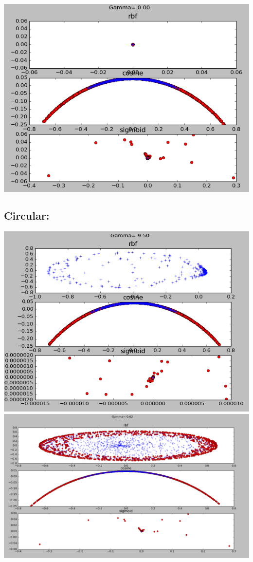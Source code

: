 \documentclass{article}
\begin{document}
\includegraphics[width=\textwidth]{line}

\subsection{Circular:}

\includegraphics[width=\textwidth]{circ}
\includegraphics[width=\textwidth]{circu}
\end{document}

